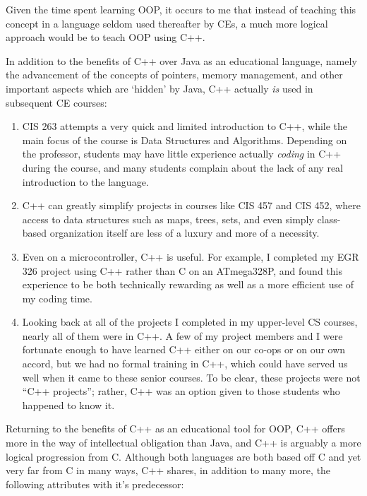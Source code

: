 \documentclass[12pt]{article}
\numberwithin{figure}{section}
\numberwithin{equation}{section}
\begin{document}
{\bigskip

Given the time spent learning OOP, it occurs to me that instead of teaching
this concept in a language seldom used thereafter by CEs, a much more
logical approach would be to teach OOP using C++.

\bigskip

In addition to the benefits of C++ over Java as an educational language,
namely the advancement of the concepts of pointers, memory management,
and other important aspects which are `hidden' by Java, C++ actually
\emph{is} used in subsequent CE courses:

\begin{enumerate}
\item   CIS 263 attempts a very quick and limited introduction to C++, while
        the main focus of the course is Data Structures and Algorithms.
        Depending on the professor, students may have little experience
        actually \emph{coding} in C++ during the course, and many students
        complain about the lack of any real introduction to the language.
\item   C++ can greatly simplify projects in courses like CIS 457 and CIS 452,
        where access to data structures such as maps, trees, sets, and even
        simply class-based organization itself are less of a luxury and more
        of a necessity.
\item   Even on a microcontroller, C++ is useful. For example, I completed
        my EGR 326 project using C++ rather than C on an ATmega328P, and found
        this experience to be both technically rewarding as well as a more
        efficient use of my coding time.
\item   Looking back at all of the projects I completed in my upper-level CS courses, nearly all of them were in C++. A few of my project members and I were fortunate enough to have learned C++ either on our co-ops or on our own accord, but we had no formal training in C++, which could have served us well when it came to these senior courses. To be clear, these projects were not ``C++ projects''; rather, C++ was an option given to those students who happened to know it.
\end{enumerate}

Returning to the benefits of C++ as an educational tool for OOP, C++
offers more in the way of intellectual obligation than Java, and C++ is
arguably a more logical progression from C. Although both languages are
both based off C and yet very far from C in many ways, C++ shares, in
addition to many more, the following attributes with it's predecessor:

}
\end{document}
